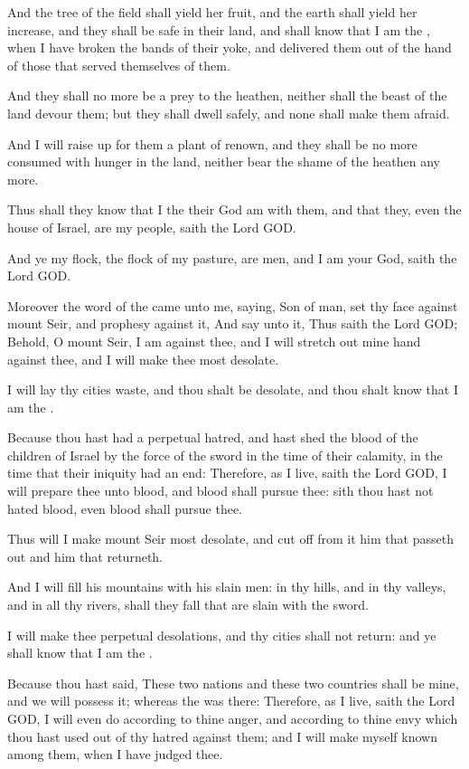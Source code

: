 \Verse And the tree of the field shall yield her fruit, and the earth shall yield her increase, and they shall be safe in their land, and shall know that I am the \LORD, when I have broken the bands of their yoke, and delivered them out of the hand of those that served themselves of them.

\Verse And they shall no more be a prey to the heathen, neither shall the beast of the land devour them; but they shall dwell safely, and none shall make them afraid.

\Verse And I will raise up for them a plant of renown, and they shall be no more consumed with hunger in the land, neither bear the shame of the heathen any more.

\Verse Thus shall they know that I the \LORD their God am with them, and that they, even the house of Israel, are my people, saith the Lord GOD.

\Verse And ye my flock, the flock of my pasture, are men, and I am your God, saith the Lord GOD.


\Chapter
\Verse Moreover the word of the \LORD came unto me, saying, \Verse Son of man, set thy face against mount Seir, and prophesy against it, \Verse And say unto it, Thus saith the Lord GOD; Behold, O mount Seir, I am against thee, and I will stretch out mine hand against thee, and I will make thee most desolate.

\Verse I will lay thy cities waste, and thou shalt be desolate, and thou shalt know that I am the \LORD.

\Verse Because thou hast had a perpetual hatred, and hast shed the blood of the children of Israel by the force of the sword in the time of their calamity, in the time that their iniquity had an end: \Verse Therefore, as I live, saith the Lord GOD, I will prepare thee unto blood, and blood shall pursue thee: sith thou hast not hated blood, even blood shall pursue thee.

\Verse Thus will I make mount Seir most desolate, and cut off from it him that passeth out and him that returneth.

\Verse And I will fill his mountains with his slain men: in thy hills, and in thy valleys, and in all thy rivers, shall they fall that are slain with the sword.

\Verse I will make thee perpetual desolations, and thy cities shall not return: and ye shall know that I am the \LORD.

\Verse Because thou hast said, These two nations and these two countries shall be mine, and we will possess it; whereas the \LORD was there: \Verse Therefore, as I live, saith the Lord GOD, I will even do according to thine anger, and according to thine envy which thou hast used out of thy hatred against them; and I will make myself known among them, when I have judged thee.

